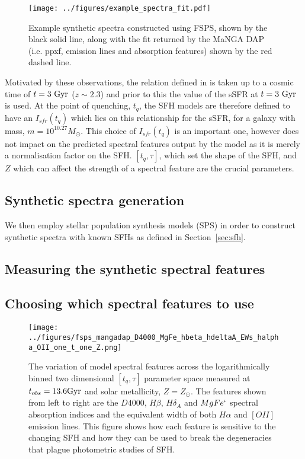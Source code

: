 \documentclass[useAMS,usenatbib]{mn2e}
\begin{document}
\begin{figure*}
\centering
\texttt{[image: ../figures/example\_spectra\_fit.pdf]}
\caption{Example synthetic spectra constructed using FSPS, shown by the black solid line, along with the fit returned by the MaNGA DAP (i.e. ppxf, emission lines and absorption features) shown by the red dashed line. }
\label{fig:spectrafit}
\end{figure*}

Motivated by these observations, the relation defined in \citet{peng10} is taken up to a cosmic time of $t=3~\rm{Gyr}$ ($z \sim 2.3$) and prior to this the value of the sSFR at $t=3~\rm{Gyr}$ is used. At the point of quenching, $t_{q}$, the SFH models are therefore defined to have an $I_{sfr}(t_q)$ which lies on this relationship for the sSFR, for a galaxy with mass, $m = 10^{10.27} M_{\odot}$. This choice of $I_{sfr}(t_q)$ is an important one, however does not impact on the predicted spectral features output by the model as it is merely a normalisation factor on the SFH. $[t_q, \tau]$, which set the shape of the SFH, and $Z$ which can affect the strength of a spectral feature are the crucial parameters.

\subsection{Synthetic spectra generation}\label{sec:fsps}


We then employ stellar population synthesis models (SPS) in order to construct synthetic spectra with known SFHs as defined in Section~\ref{sec:sfh}. 


\subsection{Measuring the synthetic spectral features}\label{sec:dap}

\subsection{Choosing which spectral features to use}

\begin{figure*}
\centering
\texttt{[image: ../figures/fsps\_mangadap\_D4000\_MgFe\_hbeta\_hdeltaA\_EWs\_halpha\_OII\_one\_t\_one\_Z.png]}
\caption{The variation of model spectral features across the logarithmically binned two dimensional $[t_q, \tau]$ parameter space measured at $t_{obs}=13.6\rm{Gyr}$ and solar metallicity, $Z=Z_{\odot}$. The features shown from left to right are the $D4000$, $H\beta$, $H\delta_A$ and $MgFe`$ spectral absorption indices and the equivalent width of both $H\alpha$ and $[OII]$ emission lines. This figure shows how each feature is sensitive to the changing SFH and how they can be used to break the degeneracies that plague photometric studies of SFH. }
\label{fig:rainbow}
\end{figure*}
\end{document}
